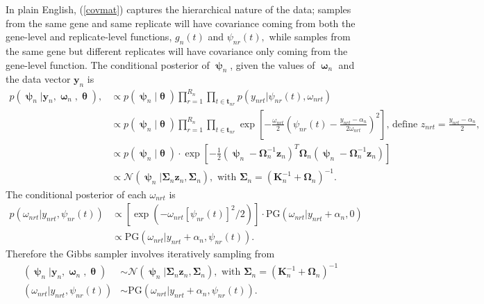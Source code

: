 \documentclass[11pt]{article}
\newcommand{\pN}{\mathcal{N}}
\newcommand{\1}{\mathbf{1}}
\newcommand{\0}{\mathbf{0}}
\newcommand{\K}{\mathbf{K}}
\newcommand{\y}{\mathbf{y}}
\begin{document}
%
%
%
In plain English, (\ref{covmat}) captures the hierarchical nature of the data; samples from the same gene and same replicate will have covariance coming from both the gene-level and replicate-level functions, $g_n(t)$ and $\psi_{nr}(t),$ while samples from the same gene but different replicates will have covariance only coming from the gene-level function. The conditional posterior of $\bm{\uppsi}_{n}$, given the values of $\bm{\upomega}_{n}$ and the data vector $\y_{n}$ is 
%
%
\begin{align*}
	p(\bm{\uppsi}_{n} | \y_{n}, \bm{\upomega}_{n}, \bm{\uptheta}),  &\propto p(\bm{\uppsi}_n | \bm{\uptheta}) \prod_{r=1}^{R_n} \prod_{t\in\mathbf{t}_{nr}} p(y_{nrt} | \psi_{nr}(t), \omega_{nrt}) \\%
	 &\propto p(\bm{\uppsi}_n | \bm{\uptheta}) \prod_{r=1}^{R_n} \prod_{t\in\mathbf{t}_{nr}} \exp\left[ -\frac{\omega_{nrt}}{2}\left( \psi_{nr}(t) - \frac{y_{nrt} - \alpha_{n}}{2 \omega_{nrt}} \right)^2 \right] \text{, define } z_{nrt} = \frac{y_{nrt} - \alpha_{n}}{2 }, \\
	&\propto p(\bm{\uppsi}_{n} | \bm{\uptheta}) \cdot \exp \left[ -\frac{1}{2} \left( \bm{\uppsi}_{n} - \bm{\Omega}^{-1}_{n} \mathbf{z}_n \right)^T \bm{\Omega}_{n} \left( \bm{\uppsi}_{n} - \bm{\Omega}_{n}^{-1} \mathbf{z}_n \right) \right] \\
	&\propto \pN \left(\bm{\uppsi}_{n} | \bm{\Sigma}_{n} \mathbf{z}_n, \bm{\Sigma}_{n}  \right), \text{ with } \bm{\Sigma}_{n} = \left( \K_n^{-1} + \bm{\Omega}_{n} \right)^{-1}.
\end{align*}
%
%
%
%
The conditional posterior of each $\omega_{nrt}$ is 
%
%
%
\begin{align*}
	p(\omega_{nrt} | y_{nrt}, \psi_{nr}(t)) &\propto \left[ \exp\left( -\omega_{nrt}\left[ \psi_{nr}(t) \right]^2 / 2 \right) \right] \cdot \text{PG}(\omega_{nrt} | y_{nrt} + \alpha_{n}, 0) \\
	&\propto \text{PG}(\omega_{nrt} | y_{nrt} + \alpha_{n}, \psi_{nr}(t)).
\end{align*}
%
%
%
Therefore the Gibbs sampler involves iteratively sampling from 
%
%
%
\begin{align}
	 (\bm{\uppsi}_{n} | \y_{n}, \bm{\upomega}_{n}, \bm{\uptheta}) &\sim \pN \left(\bm{\uppsi}_{n} | \bm{\Sigma}_{n} \mathbf{z}_n, \bm{\Sigma}_{n}  \right), \text{ with } \bm{\Sigma}_{n} = \left( \K_n^{-1} + \bm{\Omega}_{n} \right)^{-1} \\
	(\omega_{nrt} | y_{nrt}, \psi_{nr}(t)) &\sim \text{PG}(\omega_{nrt} | y_{nrt} + \alpha_{n}, \psi_{nr}(t)).
\end{align}
%
%
%
\end{document}
